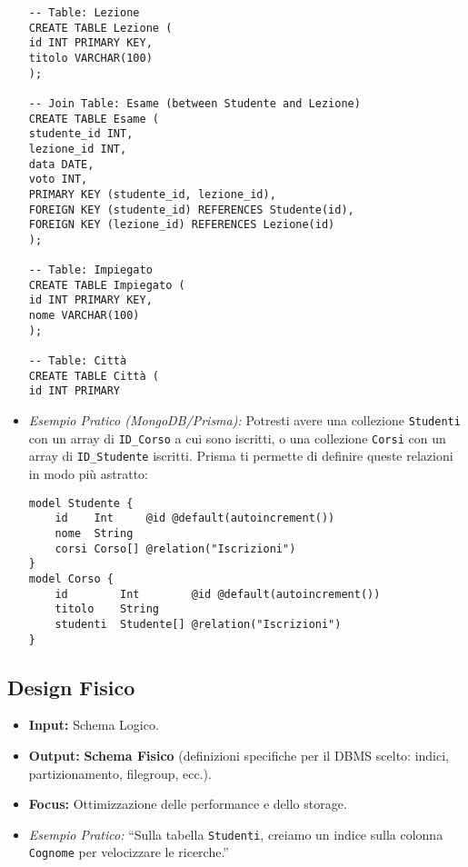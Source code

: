 \documentclass{article}
\begin{document}
\begin{itemize}
\begin{verbatim}
-- Table: Lezione
CREATE TABLE Lezione (
id INT PRIMARY KEY,
titolo VARCHAR(100)
);

-- Join Table: Esame (between Studente and Lezione)
CREATE TABLE Esame (
studente_id INT,
lezione_id INT,
data DATE,
voto INT,
PRIMARY KEY (studente_id, lezione_id),
FOREIGN KEY (studente_id) REFERENCES Studente(id),
FOREIGN KEY (lezione_id) REFERENCES Lezione(id)
);

-- Table: Impiegato
CREATE TABLE Impiegato (
id INT PRIMARY KEY,
nome VARCHAR(100)
);

-- Table: Città
CREATE TABLE Città (
id INT PRIMARY
		\end{verbatim}
		\item \textit{Esempio Pratico (MongoDB/Prisma):} Potresti avere una collezione \texttt{Studenti} con un array di \texttt{ID\_Corso} a cui sono iscritti, o una collezione \texttt{Corsi} con un array di \texttt{ID\_Studente} iscritti. Prisma ti permette di definire queste relazioni in modo più astratto:
		\begin{verbatim}
model Studente {
	id    Int     @id @default(autoincrement())
	nome  String
	corsi Corso[] @relation("Iscrizioni")
}
model Corso {
	id        Int        @id @default(autoincrement())
	titolo    String
	studenti  Studente[] @relation("Iscrizioni")
}
		\end{verbatim}
	\end{itemize}
	
	\subsection{Design Fisico}
	\begin{itemize}
		\item \textbf{Input:} Schema Logico.
		\item \textbf{Output:} \textbf{Schema Fisico} (definizioni specifiche per il DBMS scelto: indici, partizionamento, filegroup, ecc.).
		\item \textbf{Focus:} Ottimizzazione delle performance e dello storage.
		\item \textit{Esempio Pratico:} ``Sulla tabella \texttt{Studenti}, creiamo un indice sulla colonna \texttt{Cognome} per velocizzare le ricerche.''
	\end{itemize}
	
\end{document}
